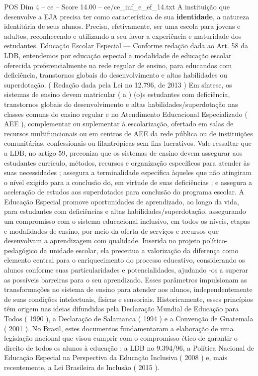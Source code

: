 \begin{textsample}{POS Dim 4 – ce – Score 14.00 – ce/ce\_inf\_e\_ef\_14.txt}
A instituição que desenvolve a EJA precisa ter como característica de sua \textbf{identidade}, a natureza identitária de seus alunos.
Precisa, efetivamente, ser uma escola para jovens e adultos, reconhecendo e utilizando a seu favor a experiência e maturidade dos estudantes.
Educação Escolar Especial — Conforme redação dada ao Art. 58 da LDB, entendemos por educação especial a modalidade de educação escolar oferecida preferencialmente na rede regular de ensino, para educandos com deficiência, transtornos globais do desenvolvimento e altas habilidades ou superdotação. ( Redação dada pela Lei no 12.796, de 2013 ) Em síntese, os sistemas de ensino devem matricular ( a ) (o)s estudantes com deficiência, transtornos globais do desenvolvimento e altas habilidades/superdotação nas classes comuns do ensino regular e no Atendimento Educacional Especializado ( AEE ), complementar ou suplementar à escolarização, ofertado em salas de recursos multifuncionais ou em centros de AEE da rede pública ou de instituições comunitárias, confessionais ou filantrópicas sem fins lucrativos.
Vale ressaltar que a LDB, no artigo 59, preconiza que os sistemas de ensino devem assegurar aos estudantes currículo, métodos, recursos e organização específicos para atender às suas necessidades ; assegura a terminalidade específica àqueles que não atingiram o nível exigido para a conclusão do, em virtude de suas deficiências ; e assegura a aceleração de estudos aos superdotados para conclusão do programa escolar.
A Educação Especial promove oportunidades de aprendizado, ao longo da vida, para estudantes com deficiências e altas habilidades/superdotação, assegurando um compromisso com o sistema educacional inclusivo, em todos os níveis, etapas e modalidades de ensino, por meio da oferta de serviços e recursos que desenvolvam a aprendizagem com qualidade.
Inserida no projeto político-pedagógico da unidade escolar, ela preceitua a valorização da diferença como elemento central para o enriquecimento do processo educativo, considerando os alunos conforme suas particularidades e potencialidades, ajudando -os a superar as possíveis barreiras para o seu aprendizado.
Esses parâmetros impulsionam as transformações no sistema de ensino para atender aos alunos, independentemente de suas condições intelectuais, físicas e sensoriais.
Historicamente, esses princípios têm origem nas ideias difundidas pela Declaração Mundial de Educação para Todos ( 1990 ), a Declaração de Salamanca ( 1994 ) e a Convenção de Guatemala ( 2001 ).
No Brasil, estes documentos fundamentaram a elaboração de uma legislação nacional que visou cumprir com o compromisso ético de garantir o direito de todos os alunos à educação : a LDB no 9.394/96, a Política Nacional de Educação Especial na Perspectiva da Educação Inclusiva ( 2008 ) e, mais recentemente, a Lei Brasileira de Inclusão ( 2015 ).

\end{textsample}

